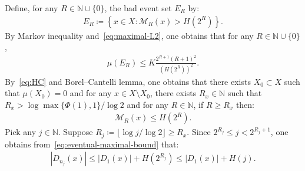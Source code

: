 \documentclass[12pt,reqno]{amsart}
\theoremstyle{definition}
\theoremstyle{plain}
\begin{document}
Define, for any $R\in\mathbb{N}\cup\{0\}$, the bad event set $E_R$ by:
\begin{align*}
    E_R
    \coloneqq \left\{x\in X:\mathcal{M}_R(x)>H\left(2^R\right)\right\}.
\end{align*}
By Markov inequality and~\eqref{eq:maximal-L2}, one obtains that for any $R\in\mathbb{N}\cup\{0\}$,
\begin{align*}
    \mu{\left(E_R\right)}
    \leq
    K\frac{2^{R+1}(R+1)^2}{\left(H\left(2^R\right)\right)^2}.
\end{align*}
By~\eqref{eq:HC} and Borel--Cantelli lemma, one obtains that there exists $X_0\subset X$ such that $\mu{(X_0)}=0$ and for any $x\in X\setminus X_0$, there exists $R_x\in\mathbb{N}$ such that $R_x>\log{\max{\{\Phi(1),1\}}}/\log{2}$ and for any $R\in\mathbb{N}$, if $R\geq R_x$ then:
\begin{align}
\label{eq:eventual-maximal-bound}
    \mathcal{M}_R(x)\leq H\left(2^R\right).
\end{align}
Pick any $j\in\mathbb{N}$. Suppose $R_j\coloneqq\lfloor{\log j}/{\log2}\rfloor\geq R_x$. Since $2^{R_j}\leq j<2^{R_j+1}$, one obtains from~\eqref{eq:eventual-maximal-bound} that:
\begin{align}
\label{eq:grid-bound}
    \left|D_{n_j}(x)\right|
    \leq \left|D_1(x)\right|+H\left(2^{R_j}\right)
    \leq \left|D_1(x)\right|+H(j).
\end{align}
\end{document}
